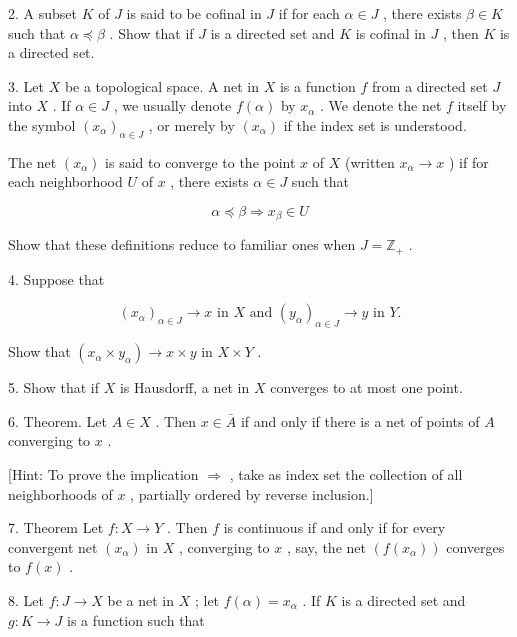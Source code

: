 \documentclass[10pt]{article}
\begin{document}
2. A subset \(K\) of \(J\) is said to be cofinal in \(J\) if for each \(\alpha  \in  J\) , there exists \(\beta  \in  K\) such that \(\alpha  \preccurlyeq  \beta\) . Show that if \(J\) is a directed set and \(K\) is cofinal in \(J\) , then \(K\) is a directed set.

3. Let \(X\) be a topological space. A net in \(X\) is a function \(f\) from a directed set \(J\) into \(X\) . If \(\alpha  \in  J\) , we usually denote \(f\left( \alpha \right)\) by \({x}_{\alpha }\) . We denote the net \(f\) itself by the symbol \({\left( {x}_{\alpha }\right) }_{\alpha  \in  J}\) , or merely by \(\left( {x}_{\alpha }\right)\) if the index set is understood.

The net \(\left( {x}_{\alpha }\right)\) is said to converge to the point \(x\) of \(X\) (written \({x}_{\alpha } \rightarrow  x\) ) if for each neighborhood \(U\) of \(x\) , there exists \(\alpha  \in  J\) such that

\[
\alpha  \preccurlyeq  \beta  \Rightarrow  {x}_{\beta } \in  U
\]

Show that these definitions reduce to familiar ones when \(J = {\mathbb{Z}}_{ + }\) .

4. Suppose that

\[
{\left( {x}_{\alpha }\right) }_{\alpha  \in  J} \rightarrow  x\text{ in }X\text{ and }{\left( {y}_{\alpha }\right) }_{\alpha  \in  J} \rightarrow  y\text{ in }Y.
\]

Show that \(\left( {{x}_{\alpha } \times  {y}_{\alpha }}\right)  \rightarrow  x \times  y\) in \(X \times  Y\) .

5. Show that if \(X\) is Hausdorff, a net in \(X\) converges to at most one point.

6. Theorem. Let \(A \in  X\) . Then \(x \in  \bar{A}\) if and only if there is a net of points of \(A\) converging to \(x\) .

[Hint: To prove the implication \(\Rightarrow\) , take as index set the collection of all neighborhoods of \(x\) , partially ordered by reverse inclusion.]

7. Theorem Let \(f : X \rightarrow  Y\) . Then \(f\) is continuous if and only if for every convergent net \(\left( {x}_{\alpha }\right)\) in \(X\) , converging to \(x\) , say, the net \(\left( {f\left( {x}_{\alpha }\right) }\right)\) converges to \(f\left( x\right)\) .

8. Let \(f : J \rightarrow  X\) be a net in \(X\) ; let \(f\left( \alpha \right)  = {x}_{\alpha }\) . If \(K\) is a directed set and \(g : K \rightarrow  J\) is a function such that
\end{document}
